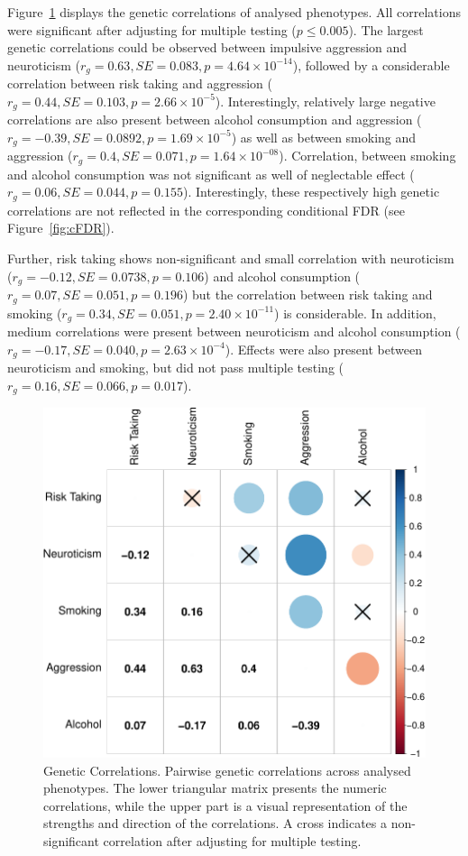 Figure~\ref{fig:gcor} displays the genetic correlations of analysed phenotypes.
All correlations were significant after adjusting for multiple testing ($p\leq0.005$).
The largest genetic correlations could be observed between impulsive aggression and neuroticism ($r_g=0.63, SE=0.083, p=4.64\times 10^{-14}$), 
followed by a considerable correlation between risk taking and aggression ($r_g=0.44, SE=0.103, p=2.66\times 10^{-5}$).
Interestingly, relatively large negative correlations are also present between alcohol consumption and aggression ($r_g=-0.39, SE=0.0892, p=1.69\times 10^{-5}$)
as well as between smoking and aggression ($r_g=0.4, SE=0.071, p=1.64\times 10^{-08}$).
Correlation, between smoking and alcohol consumption was not significant as well of neglectable effect ($r_g=0.06, SE=0.044, p=0.155$).
Interestingly, these respectively high genetic correlations are not reflected in the corresponding conditional FDR (see Figure~\ref{fig:cFDR}).

Further, risk taking shows non-significant and small correlation with neuroticism ($r_g=-0.12, SE=0.0738, p=0.106$) and
alcohol consumption ($r_g=0.07, SE=0.051, p=0.196$) but the correlation between risk taking and smoking ($r_g=0.34, SE=0.051, p=2.40\times 10^{-11}$) is considerable.
In addition, medium correlations were present between neuroticism and alcohol consumption ($r_g=-0.17, SE=0.040, p=2.63\times 10^{-4}$). 
Effects were also present between neuroticism and smoking, but did not pass multiple testing ($r_g=0.16, SE=0.066, p=0.017$).

\begin{figure}[!h]
	\centering
  \includegraphics[width=0.8\linewidth]{ukb_assoc/figure/genetic_corr/gcorr_plot_circle_full_se.pdf}
  \caption[Genetic Correlations]{Genetic Correlations.
    Pairwise genetic correlations across analysed phenotypes.
    The lower triangular matrix presents the numeric correlations, while the upper part is a visual representation of the strengths and direction of the correlations.
    A cross indicates a non-significant correlation after adjusting for multiple testing.
  }\label{fig:gcor}
\end{figure}
